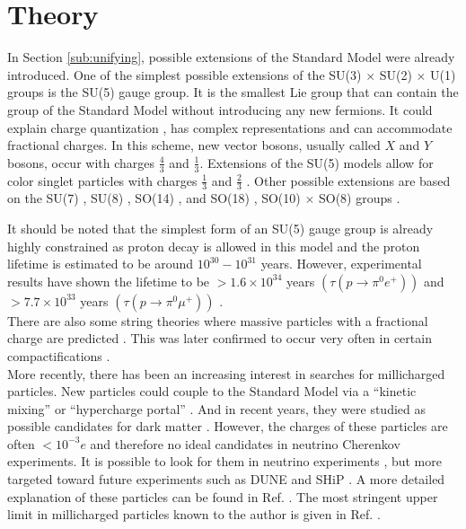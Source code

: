 \section{Theory}
In Section \ref{sub:unifying}, possible extensions of the Standard Model were already introduced. One of the simplest possible extensions of the SU(3) $\times$ SU(2) $\times$ U(1) groups is the SU(5) gauge group. It is the smallest Lie group that can contain the group of the Standard Model without introducing any new fermions. It could explain charge quantization \cite{He:1989eq}, has complex representations and can accommodate fractional charges. In this scheme, new vector bosons, usually called $X$ and $Y$ bosons, occur with charges $\frac{4}{3}$ and $\frac{1}{3}$. Extensions of the SU(5) models allow for color singlet particles with charges $\frac{1}{3}$ and $\frac{2}{3}$ \cite{Barr:1982vj}. Other possible extensions are based on the SU(7) \cite{Frampton:1982gc}, SU(8) \cite{Yu:1984pb}, SO(14) \cite{Yamamoto:1982sk}, and SO(18) \cite{Dong:1983nh}, SO(10) $\times$ SO(8) groups \cite{Jiang:1985jy}. 

It should be noted that the simplest form of an SU(5) gauge group is already highly constrained as proton decay is allowed in this model and the proton lifetime is estimated to be around $10^{30}-10^{31}$ years. However, experimental results have shown the lifetime to be $>1.6 \times 10^{34}$ years $\left(\tau\left(p \rightarrow \pi^0 e^+\right)\right)$ and $>7.7 \times 10^{33}$ years $\left(\tau\left(p \rightarrow \pi^0 \mu^+\right)\right)$ \cite{Miura:2016krn}.\\
\newline
There are also some string theories where massive particles with a fractional charge are predicted \cite{Wen:1985qj,Antoniadis:1992eb}. This was later confirmed to occur very often in certain compactifications \cite{Athanasiu:1988uj}.\\

\noindent More recently, there has been an increasing interest in searches for millicharged particles. New particles could couple to the Standard Model via a ``kinetic mixing'' or ``hypercharge portal'' \cite{Holdom:1985ag,Izaguirre:2015eya}. And in recent years, they were studied as possible candidates for dark matter \cite{Brahm:1989jh,Boehm:2003hm,Pospelov:2007mp,Bjorken:2009mm}. However, the charges of these particles are often $<10^{-3}e$ and therefore no ideal candidates in neutrino Cherenkov experiments. It is possible to look for them in neutrino experiments \cite{Magill:2018tbb}, but more targeted toward future experiments such as DUNE \cite{Acciarri:2015uup} and SHiP \cite{Anelli:2015pba}. A more detailed explanation of these particles can be found in Ref. \cite{Battaglieri:2017aum}. The most stringent upper limit in millicharged particles known to the author is given in Ref. \cite{Alvis:2018yte}.\\


